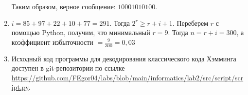 \begin{enumerate}
    Таким образом, верное сообщение: $10001010100$.

    \item $i = 85 + 97 + 22 + 10 + 77 = 291$. Тогда $2^r \geqslant r + i + 1$. Переберем $r$ с помощью Python, получим,
    что минимальный $r = 9$. Тогда $n = r + i = 300$, а коэффициент избыточности $= \frac{9}{300} = 0{,}03$


    \item Исходный код программы для декодирования классического кода Хэмминга доступен в git-репозитории по ссылке
    \url{https://github.com/FEgor04/labs/blob/main/informatics/lab2/src/script/script.py}.
\end{enumerate}